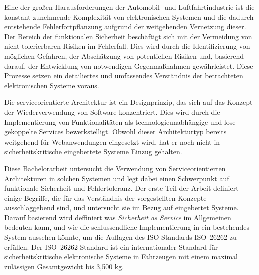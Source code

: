 Eine der großen Harausforderungen der Automobil- und Luftfahrtindustrie ist die konstant zunehmende Komplexität von elektronischen Systemen und die dadurch entstehende Fehlerfortpflanzung aufgrund der weitgehenden Vernetzung dieser. Der Bereich der funktionalen Sicherheit beschäftigt sich mit der Vermeidung von nicht tolerierbaren Risiken im Fehlerfall. Dies wird durch die Identifizierung von möglichen Gefahren, der Abschätzung von potentiellen Risiken und, basierend darauf, der Entwicklung von notwendigen Gegenmaßnahmen gewährleistet. Diese Prozesse setzen ein detailiertes und umfassendes Verständnis der betrachteten elektronischen Systeme voraus.

Die serviceorientierte Architektur ist ein Designprinzip, das sich auf das Konzept der Wiederverwendung von Software konzentriert. Dies wird durch die Implementierung von Funktionalitäten als technologieunabhängige und lose gekoppelte Services bewerkstelligt. Obwohl dieser Architekturtyp bereits weitgehend für Webanwendungen eingesetzt wird, hat er noch nicht in sicherheitskritische eingebettete Systeme Einzug gehalten.

Diese Bachelorarbeit untersucht die Verwendung von Serviceorientierten Architekturen in solchen Systemen und legt dabei einen Schwerpunkt auf funktionale Sicherheit und Fehlertoleranz. Der erste Teil der Arbeit definiert einige Begriffe, die für das Verständnis der vorgestellten Konzepte ausschlaggebend sind, und untersucht sie im Bezug auf eingebettet Systeme. Darauf basierend wird deffiniert was \emph{Sicherheit as Service} im Allgemeinen bedeuten kann, und wie die schlussendliche Implementierung in ein bestehendes System aussehen könnte, um die Auflagen des ISO-Standards \mbox{ISO 26262} zu erfüllen. Der \mbox{ISO 26262} Standard ist ein internationaler Standard für sicherheitskritische elektronische Systeme in Fahrzeugen mit einem maximal zulässigen Gesamtgewicht bis 3,500 kg.